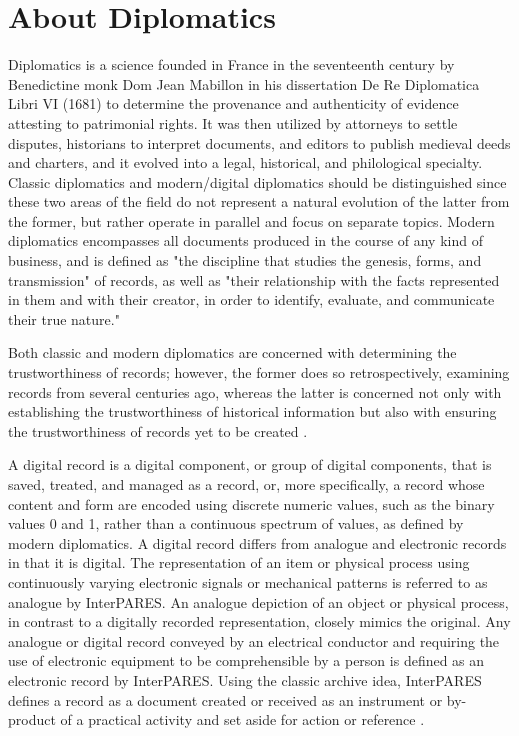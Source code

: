 \section{About Diplomatics}
Diplomatics is a science founded in France in the seventeenth century by Benedictine monk Dom Jean Mabillon in his dissertation De Re Diplomatica Libri VI (1681) to determine the provenance and authenticity of evidence attesting to patrimonial rights. It was then utilized by attorneys to settle disputes, historians to interpret documents, and editors to publish medieval deeds and charters, and it evolved into a legal, historical, and philological specialty.
Classic diplomatics and modern/digital diplomatics should be distinguished since these two areas of the field do not represent a natural evolution of the latter from the former, but rather operate in parallel and focus on separate topics. Modern diplomatics encompasses all documents produced in the course of any kind of business, and is defined as "the discipline that studies the genesis, forms, and transmission" of records, as well as "their relationship with the facts represented in them and with their creator, in order to identify, evaluate, and communicate their true nature."

Both classic and modern diplomatics are concerned with determining the trustworthiness of records; however, the former does so retrospectively, examining records from several centuries ago, whereas the latter is concerned not only with establishing the trustworthiness of historical information but also with ensuring the trustworthiness of records yet to be created \cite[10]{kirschenbaum2010digital}. 

A digital record is a digital component, or group of digital components, that is saved, treated, and managed as a record, or, more specifically, a record whose content and form are encoded using discrete numeric values, such as the binary values 0 and 1, rather than a continuous spectrum of values, as defined by modern diplomatics. A digital record differs from analogue and electronic records in that it is digital. The representation of an item or physical process using continuously varying electronic signals or mechanical patterns is referred to as analogue by InterPARES.
An analogue depiction of an object or physical process, in contrast to a digitally recorded representation, closely mimics the original. Any analogue or digital record conveyed by an electrical conductor and requiring the use of electronic equipment to be comprehensible by a person is defined as an electronic record by InterPARES. Using the classic archive idea, InterPARES defines a record as a document created or received as an instrument or by-product of a practical activity and set aside for action or reference \cite[52]{duranti2009digital}.

